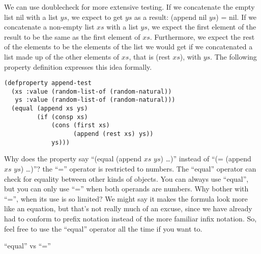 We can use doublecheck for more extensive testing. 
If we concatenate the empty list nil with a list $ys$, 
we expect to get $ys$ as a result: (append nil $ys$) = nil. 
If we concatenate a non-empty list $xs$ with a list $ys$, 
we expect the first element of the result to be the same as 
the first element of $xs$. 
Furthermore, we expect the rest of the elements to be 
the elements of the list we would get if we concatenated 
a list made up of the other elements of $xs$, that is (rest $xs$),  
with $ys$. The following property definition expresses this idea formally.

\begin{samepage}
\begin{lstlisting}
(defproperty append-test
  (xs :value (random-list-of (random-natural))
   ys :value (random-list-of (random-natural)))
  (equal (append xs ys)
         (if (consp xs)
             (cons (first xs)
                   (append (rest xs) ys))
             ys)))
\end{lstlisting}
\end{samepage}

\begin{aside}
Why does the property say ``(equal (append $xs$ $ys$) \dots)'' instead of ``(= (append $xs$ $ys$) \dots)''? the ``='' operator is restricted to numbers. The ``equal'' operator can check for equality between other kinds of objects. You can always use ``equal'', but you can only use ``='' when both operands are numbers. Why bother with ``='', when its use is so limited? We might say it makes the formula look more like an equation, but that's not really much of an excuse, since we have already had to conform to prefix notation instead of the more familiar infix notation. So, feel free to use the ``equal'' operator all the time if you want to. 
\caption{``equal'' vs ``=''}
\label{equal}
\end{aside}

\begin{comment}
This might not be the first test you would think of, but if the test failed to pass, you would for sure know something was wrong with the append operator.
This is another property that ACL2 can prove when it is stated as a theorem.

\begin{lstlisting}
(defthmd append-thm
  (equal (append xs ys)
         (if (consp xs)
             (cons (first xs)            ; {app1}
                   (append (rest xs) ys))
             ys)))                       ; {app0}
\end{lstlisting}
\end{comment}

